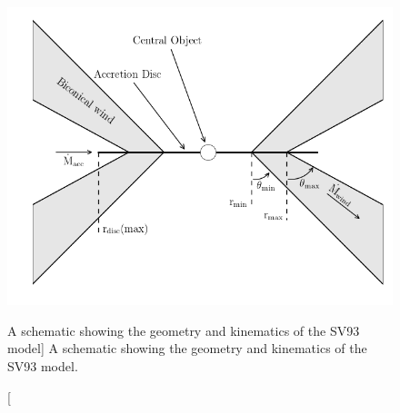 \begin{figure}
\centering
\includegraphics[width=1.0\textwidth]{figures/02-outflows/cartoon_general.png}
\caption
[A schematic showing the geometry and kinematics of the SV93 model]
{
A schematic showing the geometry and kinematics of the SV93 model. 
} 
\label{fig:sv93}
\end{figure}


